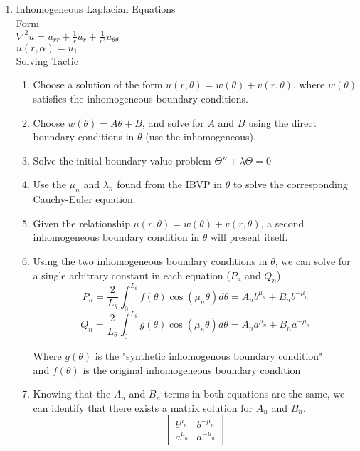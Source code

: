 \documentclass{article}
\begin{document}
\begin{enumerate}
\pagebreak
    \item Inhomogeneous Laplacian Equations
    \medskip\\
    \underline{Form}
    \medskip\\
    $\nabla^2 u = u_{rr} + \frac{1}{r}u_r + \frac{1}{r^2}u_{\theta\theta}$
    \smallskip\\
    $u(r,\alpha) = u_1$
    \medskip\\
    \underline{Solving Tactic}
    \begin{enumerate}
        \item Choose a solution of the form $u(r,\theta) = w(\theta) + v(r, \theta)$, where $w(\theta)$ satisfies the inhomogeneous boundary conditions.
        \item Choose $w(\theta) = A\theta + B$, and solve for $A$ and $B$ using the direct boundary conditions in $\theta$ (use the inhomogeneous).
        \item Solve the initial boundary value problem $\Theta'' + \lambda\Theta = 0$
        \item Use the $\mu_n$ and $\lambda_n$ found from the IBVP in $\theta$ to solve the corresponding Cauchy-Euler equation.
        \item Given the relationship $u(r, \theta) = w(\theta) + v(r, \theta)$, a second inhomogeneous boundary condition in $\theta$ will present itself.
        \item Using the two inhomogeneous boundary conditions in $\theta$, we can solve for a single arbitrary constant in each equation ($P_n$ and $Q_n$).
        \[
            P_n = \frac{2}{L_\theta}\int_0^{L_\theta}f(\theta)\cos(\mu_n \theta)d\theta = A_nb^{\mu_n} + B_nb^{-\mu_n}
        \]
        \[
            Q_n = \frac{2}{L_\theta}\int_0^{L_\theta}g(\theta)\cos(\mu_n \theta)d\theta = A_na^{\mu_n} + B_na^{-\mu_n}
        \]
        \begin{center}
            Where $g(\theta)$ is the "synthetic inhomogenous boundary condition"\\ and $f(\theta)$ is the original inhomogeneous boundary condition
        \end{center}
        \item Knowing that the $A_n$ and $B_n$ terms in both equations are the same, we can identify that there exists a matrix solution for $A_n$ and $B_n$.
        \[
            \begin{bmatrix}
                    b^{\mu_n} & b^{-\mu_n}\\
                    a^{\mu_n} & a^{-\mu_n}
            \end{bmatrix}
\]
\end{enumerate}
\end{enumerate}
\end{document}
